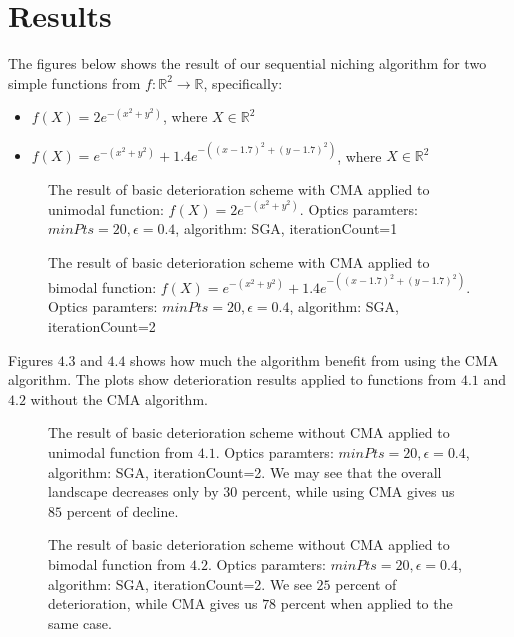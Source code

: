 \section{Results}

The figures below shows the result of our sequential niching algorithm for two
simple functions from $f:\mathbb{R}^2 \rightarrow \mathbb{R}$, specifically:
\begin{itemize}
  \item $f(X) = 2e^{-(x^2 + y^2)}$, where $X \in \mathbb{R}^2$
  \item $f(X) = e^{-(x^2 + y^2)}+1.4e^{-((x-1.7)^2 + (y-1.7)^2)}$, where $X \in
  \mathbb{R}^2$
\end{itemize}

\begin{figure}
  \centering
  \caption{The result of basic deterioration scheme with CMA 
  applied to unimodal function: $f(X) = 2e^{-(x^2 +y^2)}$.
  Optics paramters: $minPts=20, \epsilon=0.4$, algorithm: SGA, iterationCount=1}
  \label{det1}
\end{figure}

\begin{figure}
  \centering
  \caption{The result of basic deterioration scheme with CMA 
  applied to bimodal function: $f(X) = e^{-(x^2 + y^2)}+1.4e^{-((x-1.7)^2 +
  (y-1.7)^2)}$. Optics paramters: $minPts=20, \epsilon=0.4$, algorithm: SGA, iterationCount=2}
  \label{det2}
\end{figure}

Figures $4.3$ and $4.4$ shows how much the algorithm benefit from using
the CMA algorithm. The plots show deterioration results applied to
functions from $4.1$ and $4.2$ without the CMA algorithm.

\begin{figure}
  \centering
  \caption{The result of basic deterioration scheme without CMA 
  applied to unimodal function from $4.1$. Optics paramters: $minPts=20,
  \epsilon=0.4$, algorithm: SGA, iterationCount=2. We may see that the 
  overall landscape decreases only by $30$ percent, while using CMA
  gives us $85$ percent of decline.}
  \label{det3}
\end{figure}

\begin{figure}
  \centering
  \caption{The result of basic deterioration scheme without CMA 
  applied to bimodal function from $4.2$. Optics paramters: $minPts=20,
  \epsilon=0.4$, algorithm: SGA, iterationCount=2. We see $25$ percent
  of deterioration, while CMA gives us $78$ percent when applied to the same
  case.}
  \label{det3}
\end{figure}

